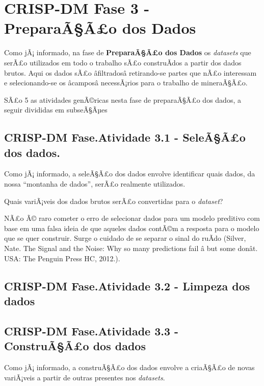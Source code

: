 \documentclass[]{article}
\begin{document}
\section{\texorpdfstring{CRISP-DM Fase 3 - \textbf{PreparaÃ§Ã£o dos
Dados}}{CRISP-DM Fase 3 - PreparaÃ§Ã£o dos Dados}}\label{crisp-dm-fase-3---preparaaao-dos-dados}

Como jÃ¡ informado, na fase de \textbf{PreparaÃ§Ã£o dos Dados} os
\emph{datasets} que serÃ£o utilizados em todo o trabalho sÃ£o
construÃ­dos a partir dos dados brutos. Aqui os dados sÃ£o
âfiltradosâ retirando-se partes que nÃ£o interessam e
selecionando-se os âcamposâ necessÃ¡rios para o trabalho de
mineraÃ§Ã£o.

SÃ£o 5 as atividades genÃ©ricas nesta fase de preparaÃ§Ã£o dos dados, a
seguir divididas em subseÃ§Ãµes

\subsection{CRISP-DM Fase.Atividade 3.1 - SeleÃ§Ã£o dos
dados.}\label{crisp-dm-fase.atividade-3.1---seleaao-dos-dados.}

Como jÃ¡ informado, a seleÃ§Ã£o dos dados envolve identificar quais
dados, da nossa ``montanha de dados'', serÃ£o realmente utilizados.

Quais variÃ¡veis dos dados brutos serÃ£o convertidas para o
\emph{dataset}?

NÃ£o Ã© raro cometer o erro de selecionar dados para um modelo preditivo
com base em uma falsa ideia de que aqueles dados contÃ©m a resposta para
o modelo que se quer construir. Surge o cuidado de se separar o sinal do
ruÃ­do (Silver, Nate. The Signal and the Noise: Why so many predictions
fail â but some donât. USA: The Penguin Press HC, 2012.).

\subsection{CRISP-DM Fase.Atividade 3.2 - Limpeza dos
dados}\label{crisp-dm-fase.atividade-3.2---limpeza-dos-dados}

\subsection{CRISP-DM Fase.Atividade 3.3 - ConstruÃ§Ã£o dos
dados}\label{crisp-dm-fase.atividade-3.3---construaao-dos-dados}

Como jÃ¡ informado, a construÃ§Ã£o dos dados envolve a criaÃ§Ã£o de
novas variÃ¡veis a partir de outras presentes nos \emph{datasets}.
\end{document}
